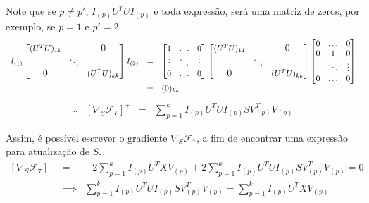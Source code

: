 \documentclass[
    12pt,                %
    oneside,            %
    a4paper,            %
    english,            %
    brazil                %
    ]{abntex2ppgsi}
\begin{document}
Note que se $p \neq p'$, $I_{(p)} U^T U I_{(p)}$ e toda expressão, será uma matriz de zeros, por exemplo, se $p=1$ e $p'=2$:
\[
\begin{array}{lcl}
    I_{(1)}
    \begin{bmatrix}
        (U^T U)_{11}            &        & \smash{\text{\large 0}} \\
                                & \ddots &                         \\
        \smash{\text{\large 0}} &        & (U^T U)_{kk}
    \end{bmatrix}
    I_{(2)}
    & = & \begin{bmatrix}
          1      & \hdots & 0      \\
          \vdots & \ddots & \vdots \\
          0      & \hdots & 0
      \end{bmatrix}
      \begin{bmatrix}
          (U^T U)_{11}            &        & \smash{\text{\large 0}} \\
                                  & \ddots &                         \\
          \smash{\text{\large 0}} &        & (U^T U)_{kk}
      \end{bmatrix}
      \begin{bmatrix}
          0      & \hdots & 0      \\
          0      &    1   & 0      \\
          \vdots & \ddots & \vdots \\
          0      & \hdots & 0
      \end{bmatrix} \\
      & = & (0)_{kk}
\end{array}
\]
\[
    \begin{array}{lclcl}
        \therefore & [\nabla_S \mathcal{F}_7]^+ & = & \sum_{p=1}^{k} I_{(p)} U^T U I_{(p)} S V_{(p)}^T V_{(p)}
    \end{array}
\]

Assim, é possível escrever o gradiente $\nabla_S \mathcal{F}_7$, a fim de encontrar uma expressão para atualização de $S$.
\[
    \begin{array}{lcl}
        [\nabla_S \mathcal{F}_7]^+ &     =    & - 2 \sum_{p=1}^{k} I_{(p)} U^T X V_{(p)} + 2 \sum_{p=1}^{k} I_{(p)} U^T U I_{(p)} S V_{(p)}^T V_{(p)} = 0 \\
                                   & \implies & \sum_{p=1}^{k} I_{(p)} U^T U I_{(p)} S V_{(p)}^T V_{(p)} = \sum_{p=1}^{k} I_{(p)} U^T X V_{(p)}
    \end{array}   \nonumber
\]
\end{document}
